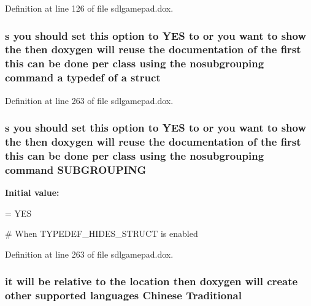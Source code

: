 Definition at line 126 of file sdlgamepad.\-dox.

\hypertarget{sdlgamepad_8dox_aba655c5729da86df745f0c8e7f9ba8d2}{
\subsubsection[{struct}]{ {\bf s} you should {\bf set} this option to Y\-E\-S to or you want to show the then doxygen will reuse the documentation of the {\bf first} this can be {\bf done} per class using the nosubgrouping command {\bf a} typedef of {\bf a} struct}}\label{sdlgamepad_8dox_aba655c5729da86df745f0c8e7f9ba8d2}


Definition at line 263 of file sdlgamepad.\-dox.

\hypertarget{sdlgamepad_8dox_ae6985312f7898cf37a90edd149dbd7fc}{
\subsubsection[{S\-U\-B\-G\-R\-O\-U\-P\-I\-N\-G}]{ {\bf s} you should {\bf set} this option to Y\-E\-S to or you want to show the then doxygen will reuse the documentation of the {\bf first} this can be {\bf done} per class using the nosubgrouping command S\-U\-B\-G\-R\-O\-U\-P\-I\-N\-G}}\label{sdlgamepad_8dox_ae6985312f7898cf37a90edd149dbd7fc}
{\bfseries Initial value\-:}
\begin{DoxyCode}
= YES

\textcolor{preprocessor}{# When TYPEDEF\_HIDES\_STRUCT is enabled}
\end{DoxyCode}


Definition at line 263 of file sdlgamepad.\-dox.

\hypertarget{sdlgamepad_8dox_ab1a4445cb897e49c113c5a2eff77118a}{
\subsubsection[{Traditional}]{\setlength{\rightskip}{0pt plus 5cm}it will be relative to the {\bf location} then doxygen will create other supported languages {\bf Chinese} Traditional}}\label{sdlgamepad_8dox_ab1a4445cb897e49c113c5a2eff77118a}


